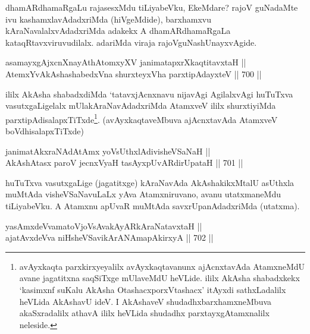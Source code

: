 \begin{artha} 
dhamARdhamaRgaLu rajasesxMdu tiLiyabeVku, EkeMdare? rajoV guNadaMte ivu kashamxlavAdadxriMda (hiVgeMdide), barxhamxvu kAraNavalalxvAdadxriMda adakekx A dhamARdhamaRgaLa kataqRtavxviruvudilalx. adariMda viraja rajoVguNashUnayxvAgide.
\end{artha}


\begin{shl}
asamayxgAjxcnXnayAthAtomxyXV janimatapxrXkaqtitavxtaH || \\
AtemxYvA\s \s kAshashabedxVna shurxteyxVha parxtipAdayxteV \hfill || 700 ||  
\end{shl}

\begin{artha} 
ililx AkAsha shabadxdiMda `tatavxjAcnxnavu nijavAgi AgilalxvAgi 
huTuTxva vasutxgaLigelalx mUlakAraNavAdadxriMda AtamxveV ililx 
shurxtiyiMda parxtipAdisalapxTiTxde\footnote{avAyxkaqta 
parxkirxyeyalilx avAyxkaqtavanunx ajAcnxtavAda AtamxneMdU avane 
jagatitxna saqSiTxge mUlaveMdU heVLide. ililx AkAsha shabadxkekx 
`kasimxnf suKalu AkAsha OtashacxporxVtashacx' itAyxdi sathxLadalilx heVLida AkAshavU ideV. I AkAshaveV 
shudadhxbarxhamxneMbuva akaSxradalilx athavA ililx heVLida shudadhx 
parxtayxgAtamxnalilx neleside.}. (avAyxkaqtaveMbuva 
ajAcnxtavAda AtamxveV boVdhisalapxTiTxde)
\end{artha}


\begin{shl}
janimatAkxraNAdAtAmx yoV\s sUthxlAdivisheVSaNaH || \\
AkAshAtasx paroV jecnxVyaH \footnotemark[2]tasAyxpUvARdirUpataH \hfill || 701 ||  
\end{shl}

\begin{artha} 
huTuTxva vasutxgaLige (jagatitxge) kAraNavAda AkAshakikxMtalU asUthxla muMtAda visheVSaNavuLaLx yAva Atamxniruvano, avanu utatxmaneMdu tiLiyabeVku. A Atamxnu apUvaR muMtAda savxrUpanAdadxriMda (utatxma).
\end{artha}


\begin{shl}
yasAmxdeVvamatoV\s joV\s sAvakAyARkAraNatavxtaH || \\
ajatAvxdeVva niHsheVSavikArANAmapAkirxyA \hfill || 702 ||  
\end{shl}

